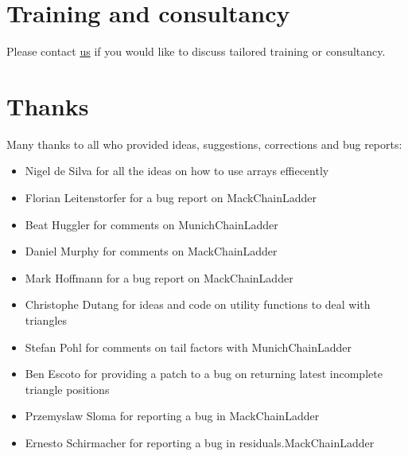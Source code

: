 \documentclass{article}
\begin{document}
\section{Training and consultancy}
Please contact \href{mailto:markus.gesmann@gmail.com}{us} if you would
like to discuss tailored training or consultancy.




\clearpage

\section*{Thanks}
Many thanks to all who provided ideas, suggestions, 
corrections and bug reports:
\begin{itemize}
\item Nigel de Silva for all the ideas on how to use arrays effiecently
\item Florian Leitenstorfer for a bug report on MackChainLadder
\item Beat Huggler for comments on MunichChainLadder
\item Daniel Murphy for comments on MackChainLadder
\item Mark Hoffmann for a bug report on MackChainLadder
\item Christophe Dutang for ideas and code on utility functions to deal with triangles
\item Stefan Pohl for comments on tail factors with MunichChainLadder
\item Ben Escoto for providing a patch to a bug on returning latest incomplete triangle positions
\item Przemyslaw Sloma for reporting a bug in MackChainLadder
\item Ernesto Schirmacher for reporting a bug in residuals.MackChainLadder\end{itemize}
\end{document}
